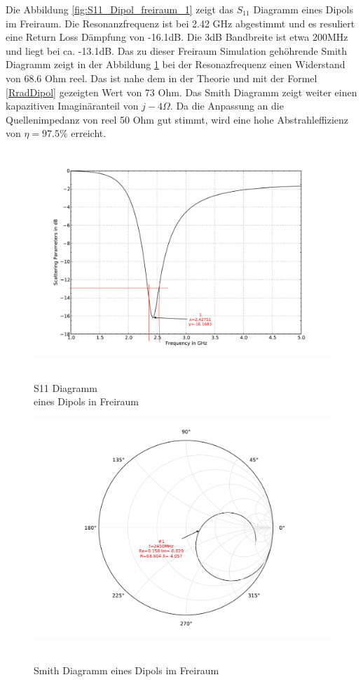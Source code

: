 Die Abbildung \ref{fig:S11_Dipol_freiraum_1} zeigt das $S_{11}$ Diagramm eines Dipols im Freiraum. Die Resonanzfrequenz ist bei 2.42 GHz abgestimmt und es resuliert eine Return Loss Dämpfung von -16.1dB. Die 3dB Bandbreite ist etwa 200MHz und liegt bei ca. -13.1dB. Das zu dieser Freiraum Simulation gehöhrende Smith Diagramm zeigt in der Abbildung \ref{fig:Smith_Dipol_freiraum_2}  bei der Resonazfrequenz einen Widerstand von 68.6 Ohm reel. Das ist nahe dem in der Theorie und mit der Formel \ref{RradDipol} gezeigten Wert von 73 Ohm. Das Smith Diagramm zeigt weiter einen kapazitiven  Imaginäranteil von $j-4\Omega$. Da die Anpassung an die Quellenimpedanz von reel 50 Ohm gut stimmt, wird eine hohe Abstrahleffizienz von $\eta = 97.5 \% $ erreicht.
\begin{figure}[!h]
\begin{center}
  \includegraphics[width=\linewidth]{content/bilder/Evaluation/Dipol/S11DipolOhneABS.pdf}
  \caption{\\S11 Diagramm \\eines Dipols in Freiraum}\label{fig:S11_Dipol_freiraum_1}
\endminipage%
{}
  \includegraphics[width=\linewidth]{content/bilder/Evaluation/Dipol/SmithDipolOhneABS.pdf}
  \caption{\\Smith Diagramm eines Dipols im Freiraum}\label{fig:Smith_Dipol_freiraum_2}
\endminipage
\end{center}
\end{figure}

